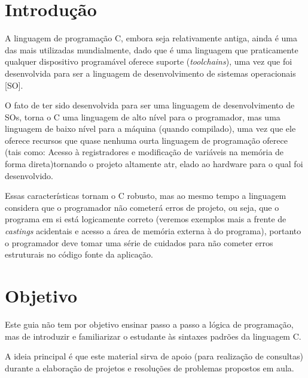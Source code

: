 \documentclass[12pt]{article}
\newcommand\tab[1][1cm]{\hspace*{#1}}
\begin{document}

\tableofcontents
\pagebreak


\section{Introdução}
\par\tab A linguagem de programação C, embora seja relativamente antiga, ainda é uma das mais utilizadas mundialmente, dado que é uma linguagem que praticamente qualquer dispositivo programável oferece suporte (\textit{toolchains}\cite{wiki:toolchain}), uma vez que foi desenvolvida para ser a linguagem de desenvolvimento de sistemas operacionais [SO].
\par\tab O fato de ter sido desenvolvida para ser uma linguagem de desenvolvimento de SOs, torna o C uma linguagem de alto nível para o programador, mas uma linguagem de baixo nível para a máquina (quando compilado), uma vez que ele oferece recursos que quase nenhuma ourta linguagem de programação oferece (tais como: Acesso à registradores e modificação de variáveis na memória de forma direta)tornando o projeto altamente atr, elado ao hardware para o qual foi desenvolvido.
\par\tab Essas características tornam o C robusto, mas ao mesmo tempo a linguagem considera que o programador não cometerá erros de projeto, ou seja, que o programa em si está logicamente correto (veremos exemplos mais a frente de \textit{castings} acidentais e acesso a área de memória externa à do programa), portanto o programador deve tomar uma série de cuidados para não cometer erros estruturais no código fonte da aplicação.

\newpage

\section{Objetivo}
\par\tab Este guia não tem por objetivo ensinar passo a passo a lógica de programação, mas de introduzir e familiarizar o estudante às sintaxes padrões da linguagem C.
\par\tab A ideia principal é que este material sirva de apoio (para realização de consultas) durante a elaboração de projetos e resoluções de problemas propostos em aula.
\newpage
\end{document}
